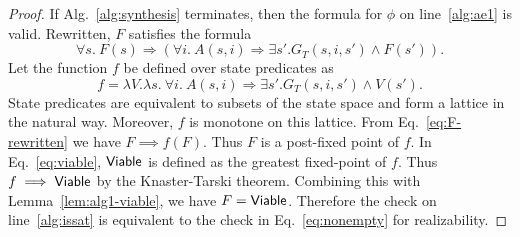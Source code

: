 \begin{proof}
If Alg.~\ref{alg:synthesis} terminates, then the
formula for $\phi$ on line~\ref{alg:ae1} is valid. Rewritten, $F$
satisfies the formula
\begin{equation}
  \forall s.~F(s) \Rightarrow \left(\forall i.~ A(s,i) \Rightarrow \exists
    s'.G_{T}(s,i,s') \land F(s')\right).
  \label{eq:F-rewritten}
\end{equation}
Let the function $f$ be defined over state predicates as
  \begin{equation}
    f = \lambda V. \lambda s.~ \forall i.~ A(s,i) \Rightarrow \exists s'.G_{T}(s,i,s') \land V(s').
    \label{eq:f-fixed-point}
  \end{equation}
  State predicates are equivalent to subsets of the state space and
  form a lattice in the natural way. Moreover, $f$ is monotone on this
  lattice. From Eq.~\ref{eq:F-rewritten} we have
  $F \implies f(F)$. Thus $F$ is a post-fixed point of $f$. In
  Eq.~\ref{eq:viable}, ${\mathsf {Viable}}$ is defined as the greatest
  fixed-point of $f$. Thus $f \implies {\mathsf {Viable}}$ by the Knaster-Tarski
  theorem. Combining this with Lemma~\ref{lem:alg1-viable}, we have
  $F = {\mathsf {Viable}}$. Therefore the check on line~\ref{alg:issat} is equivalent to the
  check in Eq.~\ref{eq:nonempty} for realizability.
\end{proof}

